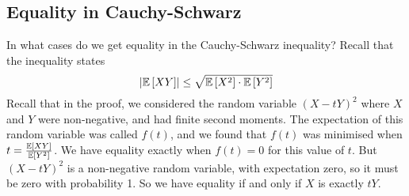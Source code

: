 \subsection{Equality in Cauchy-Schwarz}
In what cases do we get equality in the Cauchy-Schwarz inequality?
Recall that the inequality states
\[
	\abs{\mathbb{E}\left[{XY}\right]} \leq \sqrt{\mathbb{E}\left[{X^2}\right]\cdot\mathbb{E}\left[{Y^2}\right]}
\]
Recall that in the proof, we considered the random variable \((X - tY)^2\) where \(X\) and \(Y\) were non-negative, and had finite second moments.
The expectation of this random variable was called \(f(t)\), and we found that \(f(t)\) was minimised when \(t = \frac{\mathbb{E}\left[{XY}\right]}{\mathbb{E}\left[{Y^2}\right]}\).
We have equality exactly when \(f(t) = 0\) for this value of \(t\).
But \((X - tY)^2\) is a non-negative random variable, with expectation zero, so it must be zero with probability 1.
So we have equality if and only if \(X\) is exactly \(tY\).

